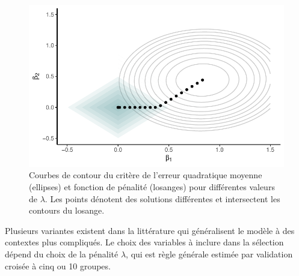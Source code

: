 \documentclass[
  11pt,
  letterpaper,
]{scrbook}
\theoremstyle{definition}
\theoremstyle{remark}
\begin{document}
\begin{figure}[ht!]

{\centering \includegraphics{selectionmodeles_files/figure-pdf/fig-lassopenalty-1.pdf}

}

\caption{\label{fig-lassopenalty}Courbes de contour du critère de
l'erreur quadratique moyenne (ellipses) et fonction de pénalité
(losanges) pour différentes valeurs de \(\lambda\). Les points dénotent
des solutions différentes et intersectent les contours du losange.}

\end{figure}

Plusieurs variantes existent dans la littérature qui généralisent le
modèle à des contextes plus compliqués. Le choix des variables à inclure
dans la sélection dépend du choix de la pénalité \(\lambda\), qui est
règle générale estimée par validation croisée à cinq ou 10 groupes.
\end{document}
